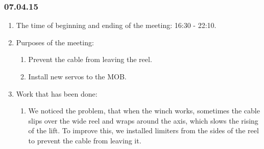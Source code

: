 \subsubsection{07.04.15}
\begin{enumerate}
	
	\item The time of beginning and ending of the meeting: 16:30 - 22:10.
	
	\item Purposes of the meeting: 
	\begin{enumerate}
		
		\item Prevent the cable from leaving the reel.
		
		\item Install new servos to the MOB.
		
	\end{enumerate}

	\item Work that has been done:
	\begin{enumerate}
		
		\item We noticed the problem, that when the winch works, sometimes the cable slips over the wide reel and wraps around the axis, which slows the rising of the lift. To improve this, we installed limiters from the sides of the reel to prevent the cable from leaving it.
		\begin{figure}[H]
			\begin{minipage}[h]{0.2\linewidth}
				\center  
			\end{minipage}
			\begin{minipage}[h]{0.6\linewidth}
				\caption{}
			\end{minipage}
		\end{figure}
		

\end{enumerate}
\end{enumerate}
